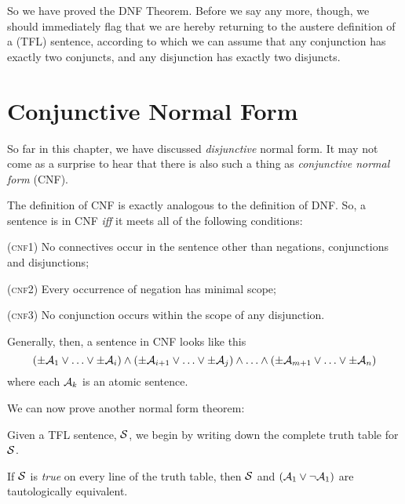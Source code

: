So we have proved the DNF Theorem. Before we say any more, though, we should immediately flag that we are hereby returning to the austere definition of a (TFL) sentence, according to which we can assume that any conjunction has exactly two conjuncts, and any disjunction has exactly two disjuncts.


\section{Conjunctive Normal Form}
\label{s:CNF}

So far in this chapter, we have discussed \emph{disjunctive} normal form. It may not come as a surprise to hear that there is also such a thing as \emph{conjunctive normal form} (CNF).

The definition of CNF is exactly analogous to the definition of DNF. So, a sentence is in CNF \emph{iff} it meets all of the following conditions:
	\begin{earg}
		\item[(\textsc{cnf1})] No connectives occur in the sentence other than negations, conjunctions and disjunctions;
		\item[(\textsc{cnf2})] Every occurrence of negation has minimal scope;
		\item[(\textsc{cnf3})] No conjunction occurs within the scope of any disjunction. 
	\end{earg}
Generally, then, a sentence in CNF looks like this
	$$(\pm \mathcal{A}_1 \lor \ldots \lor \pm \mathcal{A}_i) \land (\pm \mathcal{A}_{i+1} \lor \ldots \lor \pm\mathcal{A}_j) \land \ldots \land (\pm\mathcal{A}_{m+1} \lor\ldots \lor \pm \mathcal{A}_n)$$
where each $\mathcal{A}_k$ is an atomic sentence.

We can now prove another normal form theorem:

        
	Given a TFL sentence, $\mathcal{S}$, we begin by writing down the complete truth table for $\mathcal{S}$.
	
	If $\mathcal{S}$ is \emph{true} on every line of the truth table, then $\mathcal{S}$ and $(\mathcal{A}_1 \vee \neg \mathcal{A}_1)$ are tautologically equivalent.
	
